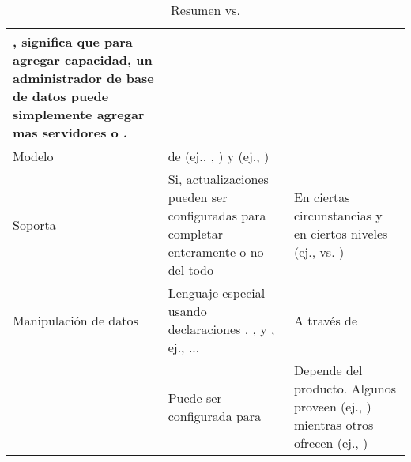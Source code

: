 \begin{table}[h!]
\begin{tabular}{ |L{0.1\paperwidth}|L{0.25\paperwidth}|L{0.25\paperwidth}|}
	\horizontallyScale, significa que para agregar capacidad, un administrador de base de datos puede simplemente agregar mas servidores o \cloudInstances.
	
\\ \hline
	Modelo \developmentPC &
	
	\mix de \openSourcePC (ej., \postgresql, \mysqlNAME) y \closedSource (ej., \oracle \dataBaseDB)&
	\openSourcePC
	
\\ \hline
	Soporta \transactionsDB&
	
	Si, actualizaciones pueden ser configuradas para completar enteramente o no del todo&	
	
	En ciertas circunstancias y en ciertos niveles (ej., \documentLevel vs. \dataBaseLevel)
	
\\ \hline
	Manipulación de datos&
	
	Lenguaje especial usando declaraciones \selectDB, \insertDB, y \updateDB, ej., \selectDBUpper \fields \fromDBUpper \tableDB \whereDBUpper ... &	
	
	A través de \apisAS \objectOrientedPL

\\ \hline

	\consistencyDB&
	
	Puede ser configurada para \strongConsistency&
	
	Depende del producto. Algunos proveen \strongConsistency (ej., \mongodbNAME) mientras otros ofrecen \eventualConsistency (ej., \cassandraNAME)

\\ \hline
\end{tabular}
    \caption{ Resumen \nosqlNAME vs. \sqlNAME}
    \label{tab:SQL_vs_noSQL_summary}
\end{table}